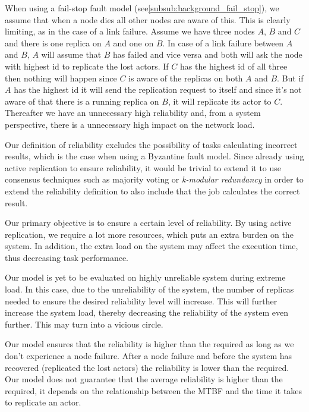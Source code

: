 \documentclass{cslthse-msc}
\begin{document}
When using a fail-stop fault model (see\autoref{subsub:background_fail_stop}), we assume that when a node dies all other nodes are aware of this. This is clearly limiting, as in the case of a link failure. Assume we have three nodes $A$, $B$ and $C$ and there is one replica on $A$ and one on $B$. In case of a link failure between $A$ and $B$, $A$ will assume that $B$ has failed and vice versa and both will ask the node with highest id to replicate the lost actors. If $C$ has the highest id of all three then nothing will happen since $C$ is aware of the replicas on both $A$ and $B$. But if $A$ has the highest id it will send the replication request to itself and since it's not aware of that there is a running replica on $B$, it will replicate its actor to $C$. Thereafter we have an unnecessary high reliability and, from a system perspective, there is a unnecessary high impact on the network load.

Our definition of reliability excludes the possibility of tasks calculating incorrect results, which is the case when using a Byzantine fault model. Since already using active replication to ensure reliability, it would be trivial to extend it to use consensus techniques such as majority voting or \emph{k-modular redundancy} in order to extend the reliability definition to also include that the job calculates the correct result.

Our primary objective is to ensure a certain level of reliability. By using active replication, we require a lot more resources, which puts an extra burden on the system. In addition, the extra load on the system may affect the execution time, thus decreasing task performance.

Our model is yet to be evaluated on highly unreliable system during extreme load. In this case, due to the unreliability of the system, the number of replicas needed to ensure the desired reliability level will increase. This will further increase the system load, thereby decreasing the reliability of the system even further. This may turn into a vicious circle.

Our model ensures that the reliability is higher than the required as long as we don't experience a node failure. After a node failure and before the system has recovered (replicated the lost actors) the reliability is lower than the required. Our model does not guarantee that the average reliability is higher than the required, it depends on the relationship between the MTBF and the time it takes to replicate an actor.
\end{document}

